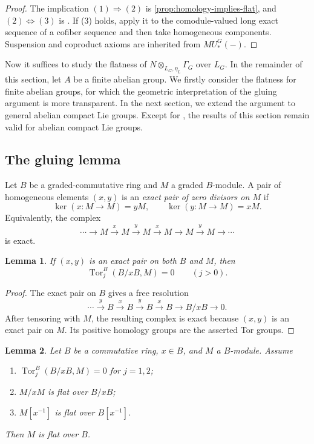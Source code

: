 \documentclass[11pt,reqno]{amsart}
\newtheorem{lemma}[lemma]{Lemma}
\newcommand{\Tor}{\operatorname{Tor}}
\newcommand{\tensor}{\otimes}
\begin{document}
\begin{proof}
The implication $(1)\Rightarrow(2)$ is
\cref{prop:homology-implies-flat}, and $(2)\Leftrightarrow(3)$ is
\cite[Lemma 2.2]{hovey2005comodules}.  If (3) holds, apply it to the comodule-valued long exact sequence of a cofiber sequence and then take homogeneous components. Suspension and coproduct axioms are inherited from $MU_*^G(-)$.
\end{proof}

Now it suffices to study the flatness of $N\tensor_{L_G,\eta_L}\Gamma_G$ over $L_G$. In the remainder of this section, let $A$ be a finite abelian group. We firstly consider the flatness for finite abelian groups, for which the geometric interpretation of the gluing argument is more transparent. In the next section, we extend the argument to general abelian compact Lie groups. Except for , the results of this section remain valid for abelian compact Lie groups.

\subsection{The gluing lemma}
Let $B$ be a graded-commutative ring and $M$ a graded $B$-module. A pair of
homogeneous elements $(x,y)$ is an \emph{exact pair of zero divisors on $M$}
if
\[
 \ker(x:M\to M)=yM,
 \qquad
 \ker(y:M\to M)=xM.
\]
Equivalently, the complex 
\[
\cdots \longrightarrow M \overset{x}{\longrightarrow} M \overset{y}{\longrightarrow}  M \overset{x}{\longrightarrow} M \to M \overset{y}{\longrightarrow} M \longrightarrow \cdots
\]
is exact.

\begin{lemma}\label{lem:tor-exact-pair}
If $(x,y)$ is an exact pair on both $B$ and $M$, then
\[
 \Tor_j^B(B/xB,M)=0
 \qquad(j>0).
\]
\end{lemma}

\begin{proof}
The exact pair on $B$ gives a free resolution
\[
  \cdots \overset{y}{\longrightarrow} B \overset{x}{\longrightarrow} B
  \overset{y}{\longrightarrow} B \overset{x}{\longrightarrow}B\longrightarrow B/xB\longrightarrow 0.
\]
After tensoring with $M$, the resulting complex is exact because $(x,y)$ is an
exact pair on $M$. Its positive homology groups are the asserted Tor groups.
\end{proof}

\begin{lemma}\label{lem:one-gluing}
Let $B$ be a commutative ring, $x\in B$, and $M$ a $B$-module. Assume
\begin{enumerate}
\item $\Tor_j^B(B/xB,M)=0$ for $j=1,2$;
\item $M/xM$ is flat over $B/xB$;
\item $M[x^{-1}]$ is flat over $B[x^{-1}]$.
\end{enumerate}
Then $M$ is flat over $B$.
\end{lemma}
\end{document}
